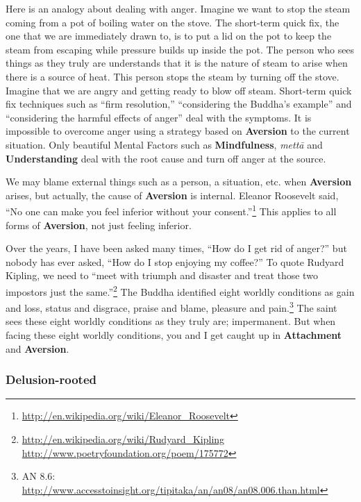 Here is an analogy about dealing with anger. Imagine we want to stop the steam coming from a pot of boiling water on the stove. The short-term quick fix, the one that we are immediately drawn to, is to put a lid on the pot to keep the steam from escaping while pressure builds up inside the pot. The person who sees things as they truly are understands that it is the nature of steam to arise when there is a source of heat. This person stops the steam by turning off the stove. Imagine that we are angry and getting ready to blow off steam. Short-term quick fix techniques such as “firm resolution,” “considering the Buddha’s example” and “considering the harmful effects of anger” deal with the symptoms. It is impossible to overcome anger using a strategy based on \textbf{Aversion} to the current situation. Only beautiful Mental Factors such as \textbf{Mindfulness}, \textit{mettā} and \textbf{Understanding} deal with the root cause and turn off anger at the source.

We may blame external things such as a person, a situation, etc. when \textbf{Aversion} arises, but actually, the cause of \textbf{Aversion} is internal. Eleanor Roosevelt said, “No one can make you feel inferior without your consent.”\footnote{\url{http://en.wikipedia.org/wiki/Eleanor_Roosevelt}} This applies to all forms of \textbf{Aversion}, not just feeling inferior.

Over the years, I have been asked many times, “How do I get rid of anger?” but nobody has ever asked, “How do I stop enjoying my coffee?” To quote Rudyard Kipling, we need to “meet with triumph and disaster and treat those two impostors just the same.”\footnote{\url{http://en.wikipedia.org/wiki/Rudyard_Kipling} \newline \url{http://www.poetryfoundation.org/poem/175772}} The Buddha identified eight worldly conditions as gain and loss, status and disgrace, praise and blame, pleasure and pain.\footnote{AN 8.6: \url{http://www.accesstoinsight.org/tipitaka/an/an08/an08.006.than.html}} The saint sees these eight worldly conditions as they truly are; impermanent. But when facing these eight worldly conditions, you and I get caught up in \textbf{Attachment} and \textbf{Aversion}.

\subsubsection*{\textbf{Delusion}-rooted}

